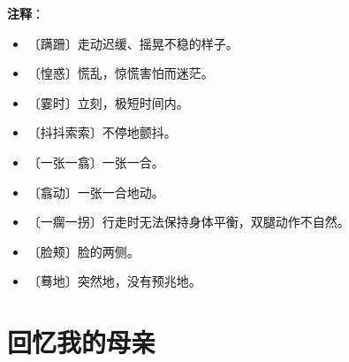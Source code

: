 \documentclass[12pt,UTF-8,openany]{ctexbook}
\begin{document}
\newpage

\textbf{注释}：

\vspace{-1em}

\begin{itemize}
    \setlength\itemsep{-0.2em}
    \item 〔蹒跚〕走动迟缓、摇晃不稳的样子。
    \item 〔惶惑〕慌乱，惊慌害怕而迷茫。
    \item 〔霎时〕立刻，极短时间内。
    \item 〔抖抖索索〕不停地颤抖。
    \item 〔一张一翕〕一张一合。
    \item 〔翕动〕一张一合地动。
    \item 〔一瘸一拐〕行走时无法保持身体平衡，双腿动作不自然。
    \item 〔脸颊〕脸的两侧。
    \item 〔蓦地〕突然地，没有预兆地。
\end{itemize}

\chapter{回忆我的母亲}
\end{document}
